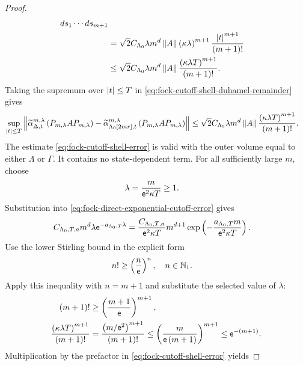 \documentclass[11pt,a4paper]{article}
\theoremstyle{plain}
\theoremstyle{definition}
\theoremstyle{remark}
\begin{document}
\begin{proof}
\begin{equation}
\begin{aligned}
\opdmsr{s_1}\cdots\opdmsr{s_{m+1}}
\\ %
& =
\sqrt{2}C_{\Lambda_0}\lambda m^d\norm{A}
\rbk{\kappa\lambda}^{m+1}
\frac{\abs{t}^{m+1}}{\rbk{m+1}!}
\\
& \leq
\sqrt{2}C_{\Lambda_0}\lambda m^d\norm{A}
\frac{\rbk{\kappa\lambda T}^{m+1}}{\rbk{m+1}!}.
\end{aligned}
\label{eq:fock-cutoff-shell-duhamel-remainder}
\end{equation}
Taking the supremum over $\left| t \right|\leq T$ in \eqref{eq:fock-cutoff-shell-duhamel-remainder} gives
\begin{equation}
\begin{aligned}
\sup_{\left| t \right| \leq T}
\left\Vert 
\widetilde{\alpha}_{\Delta,t}^{m,\lambda} \left( P_{m,\lambda} A P_{m,\lambda} \right)
-
\widetilde{\alpha}_{\Lambda_0[2 m r],t}^{m,\lambda} \left( P_{m,\lambda} A P_{m,\lambda} \right) \right\Vert
& \leq
\sqrt{2}C_{\Lambda_0} \lambda m^d \left\Vert A \right\Vert
\frac{\left( \kappa \lambda T \right)^{m + 1}}{\left( m + 1 \right)!}.
\end{aligned}
\label{eq:fock-cutoff-shell-error}
\end{equation}
The estimate \eqref{eq:fock-cutoff-shell-error} is valid with the outer volume equal to either $\Lambda$ or
$\Gamma$.
It contains no state-dependent term.
For all sufficiently large $m$, choose
$$\begin{aligned}
\lambda
& =
\frac{m}{\mathsf{e}^2\kappa T}
\geq
1.
\end{aligned}$$
Substitution into \eqref{eq:fock-direct-exponential-cutoff-error} gives
$$\begin{aligned}
C_{\Lambda_0,T,a}m^d\lambda\mathsf{e}^{-a_{\Lambda_0,T}\lambda}
& =
\frac{C_{\Lambda_0,T,a}}{\mathsf{e}^2\kappa T}
m^{d+1}
\exp \left( -\frac{a_{\Lambda_0,T}m}{\mathsf{e}^2\kappa T} \right).
\end{aligned}$$
Use the lower Stirling bound in the explicit form
$$\begin{aligned}
n!
& \geq
\left( \frac{n}{\mathsf{e}} \right)^n,
\quad
n\in\mathbb{N}_1.
\end{aligned}$$
Apply this inequality with $n=m+1$ and substitute the selected value of $\lambda$:
$$\begin{aligned}
\left( m+1 \right)!
& \geq
\left( \frac{m+1}{\mathsf{e}} \right)^{m+1},
\\
\frac{\left( \kappa\lambda T \right)^{m+1}}{\left( m+1 \right)!}
& =
\frac{\left( m/\mathsf{e}^2 \right)^{m+1}}{\left( m+1 \right)!}
\leq
\left( \frac{m}{\mathsf{e}\left( m+1 \right)} \right)^{m+1}
\leq
\mathsf{e}^{-(m+1)}.
\end{aligned}$$
Multiplication by the prefactor in \eqref{eq:fock-cutoff-shell-error} yields

\end{proof}
\end{document}
